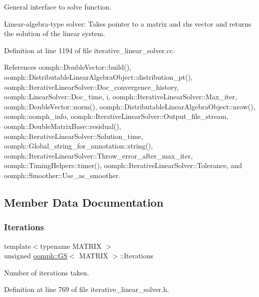 General interface to solve function. 

Linear-\/algebra-\/type solver\+: Takes pointer to a matrix and rhs vector and returns the solution of the linear system. 

Definition at line 1194 of file iterative\+\_\+linear\+\_\+solver.\+cc.



References oomph\+::\+Double\+Vector\+::build(), oomph\+::\+Distributable\+Linear\+Algebra\+Object\+::distribution\+\_\+pt(), oomph\+::\+Iterative\+Linear\+Solver\+::\+Doc\+\_\+convergence\+\_\+history, oomph\+::\+Linear\+Solver\+::\+Doc\+\_\+time, i, oomph\+::\+Iterative\+Linear\+Solver\+::\+Max\+\_\+iter, oomph\+::\+Double\+Vector\+::norm(), oomph\+::\+Distributable\+Linear\+Algebra\+Object\+::nrow(), oomph\+::oomph\+\_\+info, oomph\+::\+Iterative\+Linear\+Solver\+::\+Output\+\_\+file\+\_\+stream, oomph\+::\+Double\+Matrix\+Base\+::residual(), oomph\+::\+Iterative\+Linear\+Solver\+::\+Solution\+\_\+time, oomph\+::\+Global\+\_\+string\+\_\+for\+\_\+annotation\+::string(), oomph\+::\+Iterative\+Linear\+Solver\+::\+Throw\+\_\+error\+\_\+after\+\_\+max\+\_\+iter, oomph\+::\+Timing\+Helpers\+::timer(), oomph\+::\+Iterative\+Linear\+Solver\+::\+Tolerance, and oomph\+::\+Smoother\+::\+Use\+\_\+as\+\_\+smoother.



\subsection{Member Data Documentation}
\mbox{\label{classoomph_1_1GS_a3cef5f6067f391b7db9659d065a27cb5}} 
\subsubsection{\texorpdfstring{Iterations}{Iterations}}
{\footnotesize\ttfamily template$<$typename M\+A\+T\+R\+IX $>$ \\
unsigned \hyperlink{classoomph_1_1GS}{oomph\+::\+GS}$<$ M\+A\+T\+R\+IX $>$\+::Iterations\hspace{0.3cm}{\ttfamily [private]}}



Number of iterations taken. 



Definition at line 769 of file iterative\+\_\+linear\+\_\+solver.\+h.

